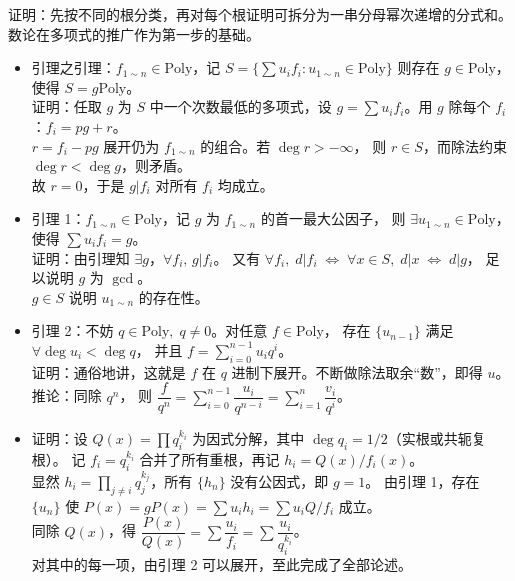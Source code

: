 \documentclass[12pt, a4paper, UTF8, openany]{ctexbook}
\newcommand{\poly}{\mathrm{Poly}}
\begin{document}
        证明：先按不同的根分类，再对每个根证明可拆分为一串分母幂次递增的分式和。数论在多项式的推广作为第一步的基础。
        \begin{itemize}
            \item 引理之引理：$f_{1 \sim n} \in \poly$，记 $S = \{\sum u_i f_i : u_{1 \sim n} \in \poly\}$
            则存在 $g \in \poly$，使得 $S = g\poly$。\\
                证明：任取 $g$ 为 $S$ 中一个次数最低的多项式，设 $g = \sum u_i f_i$。用 $g$ 除每个 $f_i$：$f_i = p g + r$。\\
                $r = f_i - pg$ 展开仍为 $f_{1 \sim n}$ 的组合。若 $\deg r > -\infty$，
                则 $r \in S$，而除法约束 $\deg r < \deg g$，则矛盾。\\
                故 $r = 0$，于是 $g | f_i$ 对所有 $f_i$ 均成立。
            \item 引理 1：$f_{1 \sim n} \in \poly$，记 $g$ 为 $f_{1 \sim n}$ 的首一最大公因子，
            则 $\exists u_{1 \sim n} \in \poly$，使得 $\sum u_i f_i = g$。\\
                证明：由引理知 $\exists g$，$\forall f_i, \, g | f_i$。
                又有 $\forall f_i, \; d | f_i \; \iff \; \forall x \in S, \; d | x \; \iff \; d | g$，
                足以说明 $g$ 为 $\gcd$。\\
                $g \in S$ 说明 $u_{1 \sim n}$ 的存在性。
            \item 引理 2：不妨 $q \in \poly, \; q \neq 0$。对任意 $f \in \poly$，
            存在 $\{u_{n - 1}\}$ 满足 $\forall \deg u_i < \deg q$，
            并且 $f = \sum_{i = 0}^{n - 1} u_i q^i$。\\
                证明：通俗地讲，这就是 $f$ 在 $q$ 进制下展开。不断做除法取余“数”，即得 $u$。\\
                {\heiti 推论}：同除 $q^n$，
                则 $\dfrac{f}{q^n} = \sum_{i = 0}^{n - 1} \dfrac{u_i}{q^{n - i}} = \sum_{i = 1}^{n} \dfrac{v_i}{q^i}$。
            \item 证明：设 $Q(x) = \prod q_i^{k_i}$ 为因式分解，其中 $\deg q_i = 1/2$（实根或共轭复根）。
                记 $f_i = q_i^{k_i}$ 合并了所有重根，再记 $h_i = Q(x) / f_i(x)$。\\
                显然 $h_i = \prod_{j \neq i} q_j^{k_j}$，所有 $\{h_n\}$ 没有公因式，即 $g = 1$。
                由引理 1，存在 $\{u_n\}$ 使 $P(x) = g P(x) = \sum u_i h_i = \sum u_i Q / f_i$ 成立。\\
                同除 $Q(x)$，得 $\dfrac{P(x)}{Q(x)} = \sum \dfrac{u_i}{f_i} = \sum \dfrac{u_i}{q_i^{k_i}}$。\\
                对其中的每一项，由引理 2 可以展开，至此完成了全部论述。
        \end{itemize}
\end{document}
